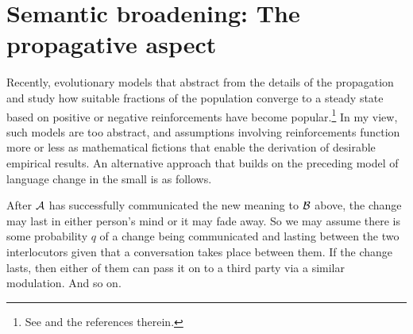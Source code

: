 \section{Semantic broadening: The propagative aspect}

Recently, evolutionary models that abstract from the details of the propagation and study how suitable fractions of the population converge to a steady state based on positive or negative reinforcements have become popular.\footnote{See \citet{yang:pslc} and the references therein.} In my view, such models are too abstract, and assumptions involving reinforcements function more or less as mathematical fictions that enable the derivation of desirable empirical results. An alternative approach that builds on the preceding model of language change in the small is as follows.

After $\cal A$ has successfully communicated the new meaning to $\cal B$ above, the change may last in either person's mind or it may fade away. So we may assume there is some probability $q$ of a change being communicated and lasting between the two interlocutors given that a conversation takes place between them. If the change lasts, then either of them can pass it on to a third party via a similar modulation. And so on.

